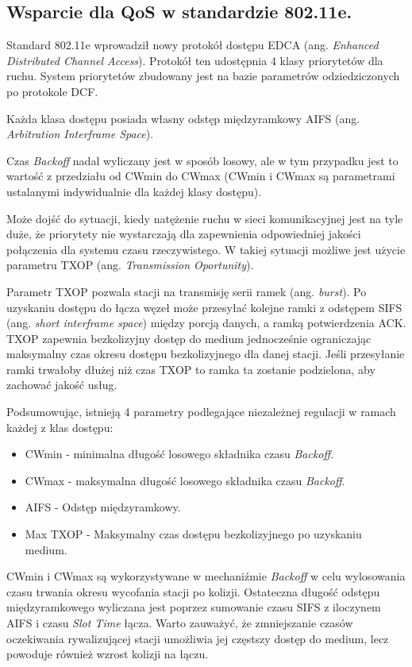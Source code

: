 \subsection{Wsparcie dla QoS w standardzie 802.11e.}

Standard 802.11e wprowadził nowy protokół dostępu EDCA (ang. \emph{Enhanced Distributed Channel Access}). Protokół ten udostępnia 4 klasy priorytetów dla ruchu. System priorytetów zbudowany jest na bazie parametrów odziedziczonych po protokole DCF. 

Każda klasa dostępu posiada własny odstęp międzyramkowy AIFS (ang. \emph{Arbitration Interframe Space}).

Czas \emph{Backoff} nadal wyliczany jest w sposób losowy, ale w tym przypadku jest to wartość z przedziału od CWmin do CWmax (CWmin i CWmax są parametrami ustalanymi indywidualnie dla każdej klasy dostępu).

Może dojść do sytuacji, kiedy natężenie ruchu w sieci komunikacyjnej jest na tyle duże, że priorytety nie wystarczają dla zapewnienia odpowiedniej jakości połączenia dla systemu czasu rzeczywistego. W takiej sytuacji możliwe jest użycie parametru TXOP (ang. \emph{Transmission Oportunity}). 

Parametr TXOP pozwala stacji na transmisję serii ramek (ang. \emph{burst}). Po uzyskaniu dostępu do łącza
węzeł może przesyłać kolejne ramki z odstępem SIFS (ang. \emph{short interframe space}) między porcją danych, a
ramką potwierdzenia ACK. TXOP zapewnia bezkolizyjny dostęp do medium jednocześnie ograniczając maksymalny czas 
okresu dostępu bezkolizyjnego dla danej stacji. Jeśli przesyłanie ramki trwałoby dłużej niż czas TXOP to ramka
ta zostanie podzielona, aby zachować jakość usług.

Podsumowując, istnieją 4 parametry podlegające niezależnej regulacji w ramach każdej z klas dostępu:

\begin{itemize}
\item CWmin - minimalna długość losowego składnika czasu \emph{Backoff}.
\item CWmax - maksymalna długość losowego składnika czasu \emph{Backoff}.
\item AIFS - Odstęp międzyramkowy.
\item Max TXOP - Maksymalny czas dostępu bezkolizyjnego po uzyskaniu medium.
\end{itemize}

CWmin i CWmax są wykorzystywane w mechaniźmie \emph{Backoff} w celu wylosowania czasu trwania okresu wycofania stacji po
kolizji. Ostateczna długość odstępu międzyramkowego wyliczana jest poprzez sumowanie czasu SIFS z iloczynem AIFS i czasu
\emph{Slot Time} łącza. Warto zauważyć, że zmniejszanie czasów oczekiwania rywalizującej stacji umożliwia jej częstszy
dostęp do medium, lecz powoduje również wzrost kolizji na łączu. 

